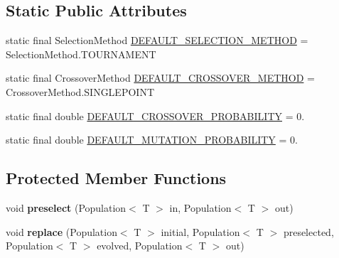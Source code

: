 \subsection*{Static Public Attributes}
\begin{DoxyCompactItemize}
\item 
static final Selection\-Method \hyperlink{classjenes_1_1stage_1_1operator_1_1common_1_1_deterministic_crowder_3_01_t_01extends_01_chromosome_01_4_a5ca3f3abce0f3163383ed9158b154289}{D\-E\-F\-A\-U\-L\-T\-\_\-\-S\-E\-L\-E\-C\-T\-I\-O\-N\-\_\-\-M\-E\-T\-H\-O\-D} = Selection\-Method.\-T\-O\-U\-R\-N\-A\-M\-E\-N\-T
\item 
static final Crossover\-Method \hyperlink{classjenes_1_1stage_1_1operator_1_1common_1_1_deterministic_crowder_3_01_t_01extends_01_chromosome_01_4_aa09cba6e344d7681789f11213d6cccd0}{D\-E\-F\-A\-U\-L\-T\-\_\-\-C\-R\-O\-S\-S\-O\-V\-E\-R\-\_\-\-M\-E\-T\-H\-O\-D} = Crossover\-Method.\-S\-I\-N\-G\-L\-E\-P\-O\-I\-N\-T
\item 
static final double \hyperlink{classjenes_1_1stage_1_1operator_1_1common_1_1_deterministic_crowder_3_01_t_01extends_01_chromosome_01_4_a824ea51baffd4e4b2fb045d38b964321}{D\-E\-F\-A\-U\-L\-T\-\_\-\-C\-R\-O\-S\-S\-O\-V\-E\-R\-\_\-\-P\-R\-O\-B\-A\-B\-I\-L\-I\-T\-Y} = 0.
\item 
static final double \hyperlink{classjenes_1_1stage_1_1operator_1_1common_1_1_deterministic_crowder_3_01_t_01extends_01_chromosome_01_4_a5a4e77ddc158a661371ea5934cce2977}{D\-E\-F\-A\-U\-L\-T\-\_\-\-M\-U\-T\-A\-T\-I\-O\-N\-\_\-\-P\-R\-O\-B\-A\-B\-I\-L\-I\-T\-Y} = 0.
\end{DoxyCompactItemize}
\subsection*{Protected Member Functions}
\begin{DoxyCompactItemize}
\item 
\hypertarget{classjenes_1_1stage_1_1operator_1_1common_1_1_deterministic_crowder_3_01_t_01extends_01_chromosome_01_4_aee04796d9d0ad969443b30cc88a1b964}{void {\bfseries preselect} (Population$<$ T $>$ in, Population$<$ T $>$ out)}\label{classjenes_1_1stage_1_1operator_1_1common_1_1_deterministic_crowder_3_01_t_01extends_01_chromosome_01_4_aee04796d9d0ad969443b30cc88a1b964}

\item 
\hypertarget{classjenes_1_1stage_1_1operator_1_1common_1_1_deterministic_crowder_3_01_t_01extends_01_chromosome_01_4_a8d9591e3962f36f1f2f59be9395806b4}{void {\bfseries replace} (Population$<$ T $>$ initial, Population$<$ T $>$ preselected, Population$<$ T $>$ evolved, Population$<$ T $>$ out)}\label{classjenes_1_1stage_1_1operator_1_1common_1_1_deterministic_crowder_3_01_t_01extends_01_chromosome_01_4_a8d9591e3962f36f1f2f59be9395806b4}

\end{DoxyCompactItemize}


